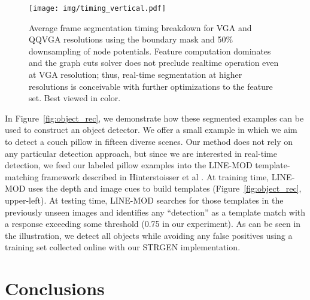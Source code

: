 \documentclass[journal]{IEEEtran}
\newcommand{\vga}{VGA\xspace}
\newcommand{\qqvga}{QQVGA\xspace}
\newcommand{\todoCR}[1]{}
\begin{document}
\todoCR{We should report how many frames were in the training set and how many clicks were necessary.  It'd be much better if we could do the viewpoint variation thing so that the number is very small.}

\begin{figure}
  \centering
  \texttt{[image: img/timing\_vertical.pdf]}
  \caption{Average frame segmentation timing breakdown for \vga and \qqvga resolutions using the boundary mask and 50\% downsampling of node potentials.  Feature computation dominates and the graph cuts solver does not preclude realtime operation even at \vga resolution; thus, real-time segmentation at higher resolutions is conceivable with further optimizations to the feature set. Best viewed in color. \todoCR{Should probably collect a 640x480 dataset, make a scaled-down copy, and compute timing results for that data.  This way, you can make an exact comparison.  As it is, the two sets of sequences are not exactly the same.  The reported claims are supported by the current plot, but it'd be nice for one to be able to make the comparison between the two total times.}}
  \label{fig:timing}
\end{figure}

In Figure~\ref{fig:object_rec}, we demonstrate how these segmented examples can be used to construct an object detector.  We offer a small example in which we aim to detect a couch pillow in fifteen diverse scenes. Our method does not rely on any particular detection approach, but since we are interested in real-time detection, we feed our labeled pillow examples into the LINE-MOD template-matching framework described in Hinterstoisser et al \cite{hinterstoisser2011a}. At training time, LINE-MOD uses the depth and image cues to build templates (Figure~\ref{fig:object_rec}, upper-left). At testing time, LINE-MOD searches for those templates in the previously unseen images and identifies any ``detection'' as a template match with a response exceeding some threshold (0.75 in our experiment).  As can be seen in the illustration, we detect all objects while avoiding any false positives using a training set collected online with our STRGEN implementation.

\section{Conclusions}
\end{document}
